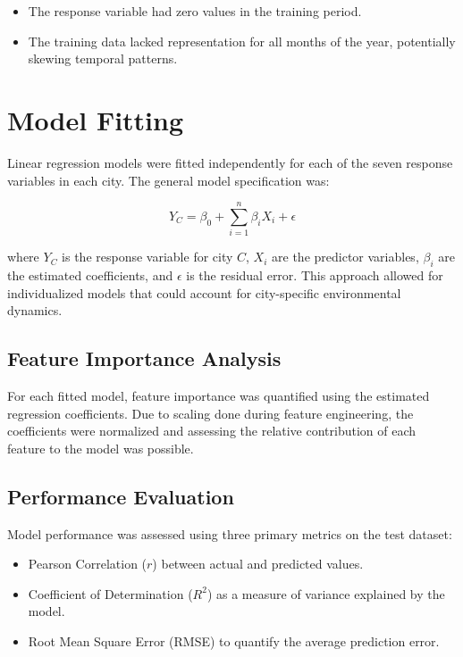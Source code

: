 \documentclass[twoside,11pt]{article}
\begin{document}
\begin{itemize}
  \item The response variable had zero values in the training period.
  \item The training data lacked representation for all months of the year, potentially skewing temporal patterns.
\end{itemize}

\section{Model Fitting}

Linear regression models were fitted independently for each of the seven response variables in each city. The general model specification was:

\[
Y_{C} = \beta_{0} + \sum_{i=1}^{n} \beta_{i} X_{i} + \epsilon
\]

where $Y_{C}$ is the response variable for city $C$, $X_{i}$ are the predictor variables, $\beta_{i}$ are the estimated coefficients, and $\epsilon$ is the residual error. This approach allowed for individualized models that could account for city-specific environmental dynamics.

\subsection{Feature Importance Analysis}

For each fitted model, feature importance was quantified using the estimated regression coefficients. Due to scaling done during feature engineering, the coefficients were normalized and assessing the relative contribution of each feature to the model was possible.

\subsection{Performance Evaluation}

Model performance was assessed using three primary metrics on the test dataset:

\begin{itemize}
  \item Pearson Correlation ($r$) between actual and predicted values.
  \item Coefficient of Determination ($R^2$) as a measure of variance explained by the model.
  \item Root Mean Square Error (RMSE) to quantify the average prediction error.
\end{itemize}
\end{document}
